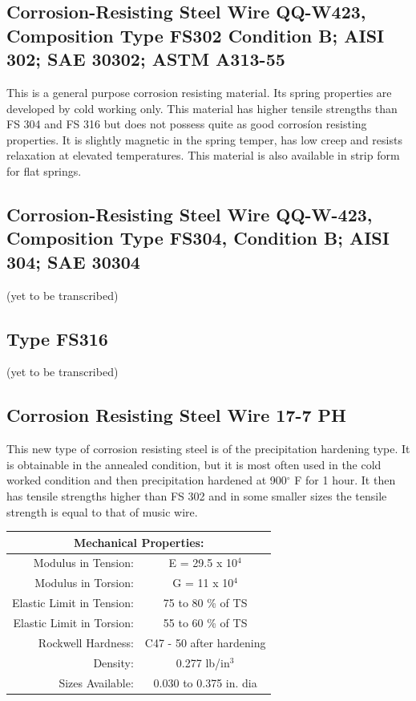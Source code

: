 \documentclass[10pt]{article}
\begin{document}
\subsection{Corrosion-Resisting Steel Wire QQ-W423, Composition Type FS302 Condition B; AISI 302; SAE 30302; ASTM A313-55} %
This is a general purpose corrosion resisting material. 
Its spring properties are developed by cold working only. 
This material has higher tensile strengths than FS 304 and FS 316 but does not possess quite as good corrosíon resisting properties.
It is slightly magnetic in the spring temper, has low creep and resists relaxation at elevated temperatures. 
This material is also available in strip form for flat springs.



\subsection{Corrosion-Resisting Steel Wire QQ-W-423, Composition Type FS304, Condition B; AISI 304; SAE 30304} %
(yet to be transcribed)

\subsection{Type FS316} %
(yet to be transcribed)

\subsection{Corrosion Resisting Steel Wire 17-7 PH} %
This new type of corrosion resisting steel is of the precipitation hardening type. 
It is obtainable in the annealed condition, but it is most often used in the cold worked condition and then precipitation hardened at 900$^\circ$ F for 1 hour.
It then has tensile strengths higher than FS 302 and in some smaller sizes the tensile strength is equal to that of music wire.

\begin{center}
\begin{tabular}{ r c }
\multicolumn{2}{c}{Mechanical Properties:} \\
\hline
Modulus in Tension: & E = 29.5 x 10$^4$ \\  
Modulus in Torsion: & G = 11 x 10$^4$ \\
Elastic Limit in Tension: & 75 to 80 \% of TS \\  
Elastic Limit in Torsion: & 55 to 60 \% of TS \\
Rockwell Hardness: & C47 - 50 after hardening \\
Density: & 0.277 lb/in$^3$ \\
Sizes Available: & 0.030 to 0.375 in. dia \\
\hline
\end{tabular}
\end{center}
\end{document}
